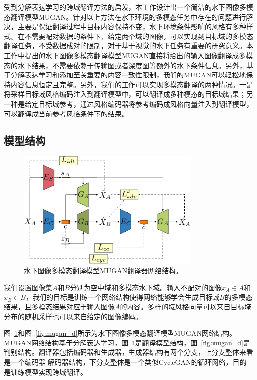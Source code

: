 受到分解表达学习的跨域翻译方法的启发，本工作设计出一个简洁的水下图像多模态翻译模型MUGAN。针对以上方法在水下环境的多模态任务中存在的问题进行解决，主要是保证翻译过程中目标内容保持不变，水下环境条件影响的风格有多种样式。在不需要配对数据的条件下，给定两个域的图像，可以实现到目标域的多模态翻译任务，不受数据成对的限制，对于基于视觉的水下任务有重要的研究意义。本工作中提出的水下图像多模态翻译模型MUGAN直接将给出的输入图像翻译成多模态的水下结果，不需要依赖于传输图或者深度图等额外的水下条件信息。另外，基于分解表达学习和添加至关重要的内容一致性限制，我们的MUGAN可以轻松地保持内容信息恒定且完整。另外，我们的工作可以实现多模态翻译的两种情况。一是将采样目标域风格编码注入到翻译模型中，可以翻译成多种模态的目标域结果；另一种是给定目标域参考，通过风格编码器将参考编码成风格向量注入到翻译模型，可以翻译成当前参考风格条件下的结果。

\subsection{模型结构}

\begin{figure}[ht]
    \centering
    \includegraphics[width=0.8\textwidth]{figures/G.pdf}
    \caption{水下图像多模态翻译模型MUGAN翻译器网络结构。}
    \label{fig:mugan_g}
\end{figure}

我们设置图像集$A$和$B$分别为空中域和多模态水下域。输入不配对的图像$x_A \in A$和$x_B \in B$，我们的目标是训练一个网络结构使得网络能够学会生成目标域$B$的多模态结果，且多模态结果对应于输入图像$A$的内容。多样的域风格向量可以来自目标域分布的随机采样也可以来自给定的图像编码。

图~\ref{fig:mugan_g}和图~\ref{fig:mugan_d}所示为水下图像多模态翻译模型MUGAN网络结构。MUGAN网络结构基于分解表达学习，图~\ref{fig:mugan_g}是翻译模型结构，图~\ref{fig:mugan_d}是判别结构。翻译器包括编码器和生成器，生成器结构有两个分支，上分支整体来看是一个编码器-解码器结构，下分支整体是一个类似CycleGAN的循环网络，目的是训练模型实现跨域翻译。

